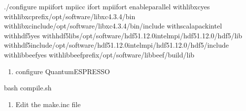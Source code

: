 \documentclass[a4paper,12pt,english]{sphinxmanual}
\begin{document}
\begin{sphinxVerbatim}[commandchars=\\\{\}]
./configure mpiifort mpiicc ifort mpiifort \PYGZhy{}enable\PYGZhy{}parallel 
        \PYGZhy{}\PYGZhy{}with\PYGZhy{}libxcyes 
        \PYGZhy{}\PYGZhy{}with\PYGZhy{}libxc\PYGZhy{}prefix/opt/software/libxc\PYGZhy{}4.3.4/bin 
        \PYGZhy{}\PYGZhy{}with\PYGZhy{}libxc\PYGZhy{}include/opt/software/libxc\PYGZhy{}4.3.4/bin/include 
        \PYGZhy{}\PYGZhy{}with\PYGZhy{}scalapackintel 
        \PYGZhy{}\PYGZhy{}with\PYGZhy{}hdf5yes 
        \PYGZhy{}\PYGZhy{}with\PYGZhy{}hdf5\PYGZhy{}libs/opt/software/hdf5\PYGZhy{}1.12.0\PYGZus{}intelmpi/hdf5\PYGZhy{}1.12.0/hdf5/lib 
        \PYGZhy{}\PYGZhy{}with\PYGZhy{}hdf5\PYGZhy{}include/opt/software/hdf5\PYGZhy{}1.12.0\PYGZus{}intelmpi/hdf5\PYGZhy{}1.12.0/hdf5/include 
        \PYGZhy{}\PYGZhy{}with\PYGZhy{}libbeefyes 
        \PYGZhy{}\PYGZhy{}with\PYGZhy{}libbeef\PYGZhy{}prefix/opt/software/libbeef/build/lib
\end{sphinxVerbatim}
\begin{enumerate}
%
\setcounter{enumi}{1}
\item {} 
\sphinxAtStartPar
configure Quantum\sphinxhyphen{}ESPRESSO

\end{enumerate}

\begin{sphinxVerbatim}[commandchars=\\\{\}]
bash compile.sh
\end{sphinxVerbatim}
\begin{enumerate}
%
\setcounter{enumi}{2}
\item {} 
\sphinxAtStartPar
Edit the make.inc file

\end{enumerate}
\end{document}
